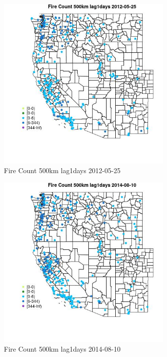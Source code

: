 \begin{figure} 
\centering  
\includegraphics[width=0.77\textwidth]{Code_Outputs/Report_ML_input_PM25_Step4_part_e_de_duplicated_aves_compiled_2019-05-18wNAs_MapObsFire_Count_500km_lag1days2012-05-25.jpg} 
\caption{\label{fig:Report_ML_input_PM25_Step4_part_e_de_duplicated_aves_compiled_2019-05-18wNAsMapObsFire_Count_500km_lag1days2012-05-25}Fire Count 500km lag1days 2012-05-25} 
\end{figure} 
 

\clearpage 

\begin{figure} 
\centering  
\includegraphics[width=0.77\textwidth]{Code_Outputs/Report_ML_input_PM25_Step4_part_e_de_duplicated_aves_compiled_2019-05-18wNAs_MapObsFire_Count_500km_lag1days2014-08-10.jpg} 
\caption{\label{fig:Report_ML_input_PM25_Step4_part_e_de_duplicated_aves_compiled_2019-05-18wNAsMapObsFire_Count_500km_lag1days2014-08-10}Fire Count 500km lag1days 2014-08-10} 
\end{figure} 
 

